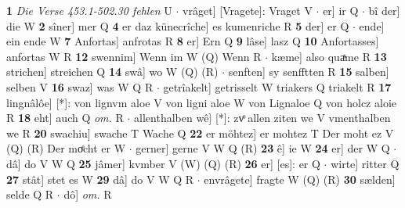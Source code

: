 \documentclass[8pt,a4paper,notitlepage]{article}
\begin{document}
\begin{table}[ht]
\begin{minipage}[t]{0.5\linewidth}
\textbf{1} \textit{Die Verse 453.1-502.30 fehlen} U   $\cdot$ vrâget] [Vragete]: Vraget V  $\cdot$ er] ir Q  $\cdot$ bî der] die W \textbf{2} sîner] mer Q \textbf{4} er daz künecrîche] es kumenriche R \textbf{5} der] er Q  $\cdot$ ende] ein ende W \textbf{7} Anfortas] anfrotas R \textbf{8} er] Ern Q \textbf{9} lâse] lasz Q \textbf{10} Anfortasses] anfortas W R \textbf{12} swennim] Wenn im W (Q) Wenn R  $\cdot$ kæme] also quaͯme R \textbf{13} strichen] streichen Q \textbf{14} swâ] wo W (Q) (R)  $\cdot$ senften] sy senfftten R \textbf{15} salben] selben V \textbf{16} swaz] was W Q R  $\cdot$ getrîakelt] getrisselt W triakers Q triakelt R \textbf{17} lingnâlôe] [*]: von lignvm aloe V von ligni aloe W von Lignaloe Q von holcz aloie R \textbf{18} eht] auch Q \textit{om.} R  $\cdot$ allenthalben wê] [*]: zvͦ allen ziten we V vmenthalben we R \textbf{20} swachiu] swache T Wache Q \textbf{22} er möhtez] er mohtez T Der moht ez V (Q) (R) Der moͤcht er W  $\cdot$ gerner] gerne V W Q (R) \textbf{23} ê] ie W \textbf{24} er] der W Q  $\cdot$ dâ] do V W Q \textbf{25} jâmer] kvmber V (W) (Q) (R) \textbf{26} er] [es]: er Q  $\cdot$ wirte] ritter Q \textbf{27} stât] stet es W \textbf{29} dâ] do V W Q R  $\cdot$ envrâgete] fragte W (Q) (R) \textbf{30} sælden] selde Q R  $\cdot$ dô] \textit{om.} R \newline
\end{minipage}
\end{table}
\end{document}
